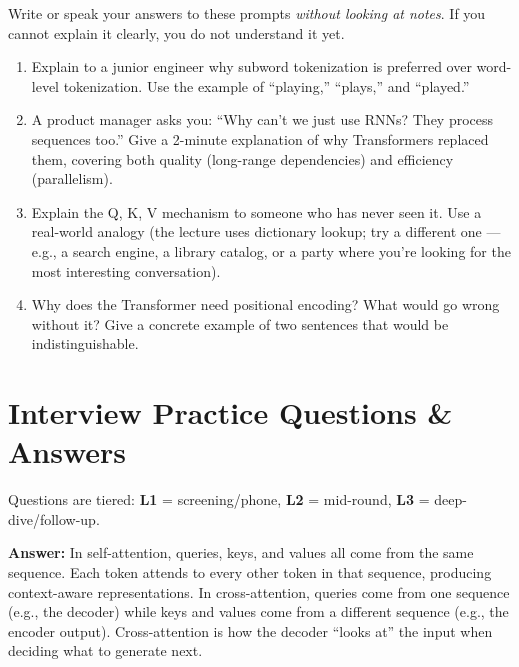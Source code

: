 \documentclass[11pt, a4paper]{article}
\begin{document}
Write or speak your answers to these prompts \emph{without looking at notes}. If you cannot explain it clearly, you do not understand it yet.

\begin{enumerate}[leftmargin=2em]
  \item Explain to a junior engineer why subword tokenization is preferred over word-level tokenization. Use the example of ``playing,'' ``plays,'' and ``played.''

  \item A product manager asks you: ``Why can't we just use RNNs? They process sequences too.'' Give a 2-minute explanation of why Transformers replaced them, covering both quality (long-range dependencies) and efficiency (parallelism).

  \item Explain the Q, K, V mechanism to someone who has never seen it. Use a real-world analogy (the lecture uses dictionary lookup; try a different one --- e.g., a search engine, a library catalog, or a party where you're looking for the most interesting conversation).

  \item Why does the Transformer need positional encoding? What would go wrong without it? Give a concrete example of two sentences that would be indistinguishable.
\end{enumerate}

\newpage
\section{Interview Practice Questions \& Answers}

Questions are tiered: \textbf{L1} = screening/phone, \textbf{L2} = mid-round, \textbf{L3} = deep-dive/follow-up.

\begin{notebox}
\textbf{Answer:} In self-attention, queries, keys, and values all come from the same sequence. Each token attends to every other token in that sequence, producing context-aware representations. In cross-attention, queries come from one sequence (e.g., the decoder) while keys and values come from a different sequence (e.g., the encoder output). Cross-attention is how the decoder ``looks at'' the input when deciding what to generate next.
\end{notebox}
\end{document}
